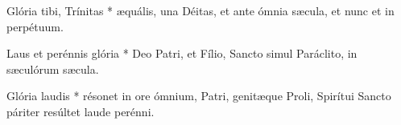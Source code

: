 



 Glória tibi, Trínitas * æquális, una Déitas, et ante ómnia sæcula, et nunc et in perpétuum.


 Laus et perénnis glória * Deo Patri, et Fílio, Sancto simul Paráclito, in sæculórum sæcula.

 Glória laudis * résonet in ore ómnium, Patri, genitæque Proli, Spirítui Sancto páriter resúltet laude perénni.

